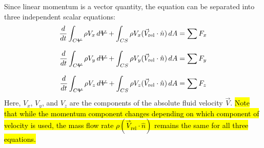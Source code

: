 ﻿\documentclass[12pt]{article}
\newcommand{\vol}{\mathord{\text{\ooalign{\hidewidth $V$\hidewidth\cr\kern-0.5pt\raisebox{0.8ex}{\rule[0pt]{1em}{0.5pt}}}}}}
\begin{document}
Since linear momentum is a vector quantity, the equation can be separated into three independent scalar equations:
\[
\begin{aligned}
\frac{d}{dt}\int_{C\vol}\rho V_x\,d\vol
+\int_{CS}\rho V_x(\vec{V}_{\mathrm{rel}}\cdot\hat{n})\,dA
&=\sum F_x\\[8pt]
\frac{d}{dt}\int_{C\vol}\rho V_y\,d\vol
+\int_{CS}\rho V_y(\vec{V}_{\mathrm{rel}}\cdot\hat{n})\,dA
&=\sum F_y\\[8pt]
\frac{d}{dt}\int_{C\vol}\rho V_z\,d\vol
+\int_{CS}\rho V_z(\vec{V}_{\mathrm{rel}}\cdot\hat{n})\,dA
&=\sum F_z
\end{aligned}
\]
Here, $V_x$, $V_y$, and $V_z$ are the components of the absolute fluid velocity $\vec{V}$. \hl{Note that while the momentum component changes depending on which component of velocity is used, the mass flow rate $\rho(\vec{V}_{\mathrm{rel}}\cdot\hat{n})$ remains the same for all three equations.}
\end{document}
